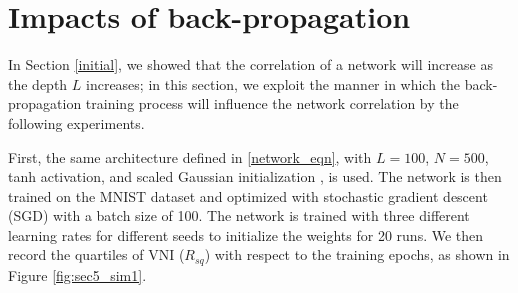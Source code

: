 
% 

%

\section{Impacts of back-propagation} \label{backprop}

In Section \ref{initial}, we showed that the correlation of a network will increase as the depth $L$ increases; in this section, we exploit the manner in which the back-propagation training process will influence the network correlation by the following experiments. 




First, the same architecture defined in \eqref{network_eqn}, with $L=100$, $N=500$, tanh activation, 
and scaled Gaussian initialization \cite{xavier}, is used. The network is then trained on the MNIST
dataset \cite{mnist} and optimized with stochastic gradient descent (SGD) with a batch size of 100.
The network is trained with three different learning rates for different seeds to initialize the weights
for 20 runs. We then record the quartiles of VNI ($R_{sq}$) with respect to the training epochs, as shown in
Figure \ref{fig:sec5_sim1}.

